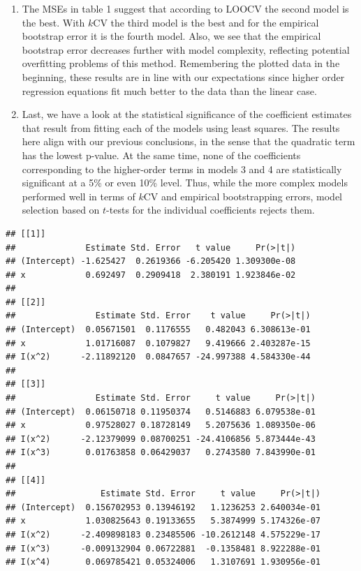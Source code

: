 \documentclass[
]{article}
\begin{document}
\begin{enumerate}
\def\labelenumi{(\alph{enumi})}
\setcounter{enumi}{3}
\item
  The MSEs in table 1 suggest that according to LOOCV the second model
  is the best. With \(k\)CV the third model is the best and for the
  empirical bootstrap error it is the fourth model. Also, we see that
  the empirical bootstrap error decreases further with model complexity,
  reflecting potential overfitting problems of this method. Remembering
  the plotted data in the beginning, these results are in line with our
  expectations since higher order regression equations fit much better
  to the data than the linear case.
\item
  Last, we have a look at the statistical significance of the
  coefficient estimates that result from fitting each of the models
  using least squares. The results here align with our previous
  conclusions, in the sense that the quadratic term has the lowest
  p-value. At the same time, none of the coefficients corresponding to
  the higher-order terms in models 3 and 4 are statistically significant
  at a 5\% or even 10\% level. Thus, while the more complex models
  performed well in terms of \(k\)CV and empirical bootstrapping errors,
  model selection based on \(t\)-tests for the individual coefficients
  rejects them.
\end{enumerate}

\begin{verbatim}
## [[1]]
##              Estimate Std. Error   t value     Pr(>|t|)
## (Intercept) -1.625427  0.2619366 -6.205420 1.309300e-08
## x            0.692497  0.2909418  2.380191 1.923846e-02
## 
## [[2]]
##                Estimate Std. Error    t value     Pr(>|t|)
## (Intercept)  0.05671501  0.1176555   0.482043 6.308613e-01
## x            1.01716087  0.1079827   9.419666 2.403287e-15
## I(x^2)      -2.11892120  0.0847657 -24.997388 4.584330e-44
## 
## [[3]]
##                Estimate Std. Error     t value     Pr(>|t|)
## (Intercept)  0.06150718 0.11950374   0.5146883 6.079538e-01
## x            0.97528027 0.18728149   5.2075636 1.089350e-06
## I(x^2)      -2.12379099 0.08700251 -24.4106856 5.873444e-43
## I(x^3)       0.01763858 0.06429037   0.2743580 7.843990e-01
## 
## [[4]]
##                 Estimate Std. Error     t value     Pr(>|t|)
## (Intercept)  0.156702953 0.13946192   1.1236253 2.640034e-01
## x            1.030825643 0.19133655   5.3874999 5.174326e-07
## I(x^2)      -2.409898183 0.23485506 -10.2612148 4.575229e-17
## I(x^3)      -0.009132904 0.06722881  -0.1358481 8.922288e-01
## I(x^4)       0.069785421 0.05324006   1.3107691 1.930956e-01
\end{verbatim}
\end{document}
